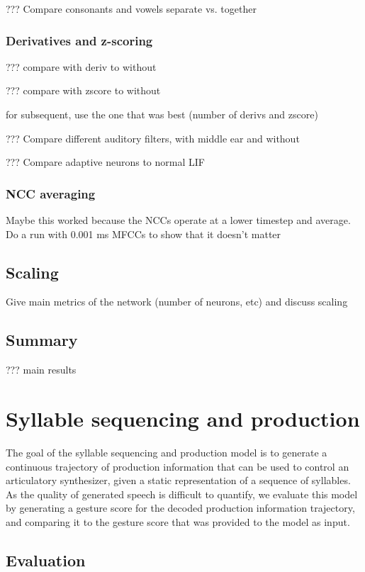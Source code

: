 ??? Compare consonants and vowels separate vs. together

\subsubsection{Derivatives and z-scoring}

??? compare with deriv to without

??? compare with zscore to without

for subsequent, use the one that was best (number of derivs
and zscore)

??? Compare different auditory filters, with middle ear and without

??? Compare adaptive neurons to normal LIF

\subsubsection{NCC averaging}

Maybe this worked because the NCCs operate
at a lower timestep and average.
Do a run with 0.001 ms MFCCs
to show that it doesn't matter

\subsection{Scaling}

Give main metrics of the network (number of neurons, etc)
and discuss scaling

\subsection{Summary}

??? main results

\section{Syllable sequencing and production}

The goal of the syllable sequencing and production model
is to generate a continuous trajectory
of production information
that can be used to control
an articulatory synthesizer,
given a static representation
of a sequence of syllables.
As the quality of generated speech
is difficult to quantify,
we evaluate this model
by generating a gesture score
for the decoded production information trajectory,
and comparing it
to the gesture score that was provided
to the model as input.

\subsection{Evaluation}

